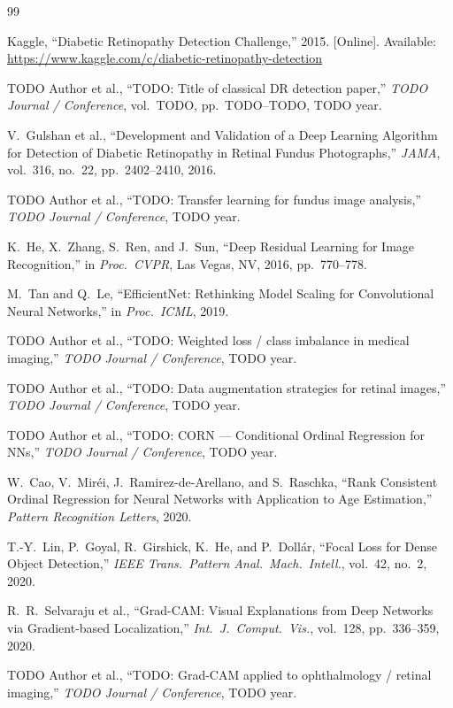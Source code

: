 \documentclass[12pt, a4paper]{article}
\begin{document}
\begin{thebibliography}{99}

Kaggle, ``Diabetic Retinopathy Detection Challenge,'' 2015.
[Online]. Available: \url{https://www.kaggle.com/c/diabetic-retinopathy-detection}

TODO Author et al., ``TODO: Title of classical DR detection paper,''
\textit{TODO Journal / Conference}, vol.~TODO, pp.~TODO--TODO, TODO year.

V.~Gulshan et al., ``Development and Validation of a Deep Learning Algorithm
for Detection of Diabetic Retinopathy in Retinal Fundus Photographs,''
\textit{JAMA}, vol.~316, no.~22, pp.~2402--2410, 2016.

TODO Author et al., ``TODO: Transfer learning for fundus image analysis,''
\textit{TODO Journal / Conference}, TODO year.

K.~He, X.~Zhang, S.~Ren, and J.~Sun, ``Deep Residual Learning for Image
Recognition,'' in \textit{Proc.\ CVPR}, Las Vegas, NV, 2016, pp.~770--778.

M.~Tan and Q.~Le, ``EfficientNet: Rethinking Model Scaling for Convolutional
Neural Networks,'' in \textit{Proc.\ ICML}, 2019.

TODO Author et al., ``TODO: Weighted loss / class imbalance in medical imaging,''
\textit{TODO Journal / Conference}, TODO year.

TODO Author et al., ``TODO: Data augmentation strategies for retinal images,''
\textit{TODO Journal / Conference}, TODO year.

TODO Author et al., ``TODO: CORN --- Conditional Ordinal Regression for NNs,''
\textit{TODO Journal / Conference}, TODO year.

W.~Cao, V.~Mir\'{e}i, J.~Ramirez-de-Arellano, and S.~Raschka,
``Rank Consistent Ordinal Regression for Neural Networks with Application to
Age Estimation,'' \textit{Pattern Recognition Letters}, 2020.

T.-Y.~Lin, P.~Goyal, R.~Girshick, K.~He, and P.~Doll\'{a}r,
``Focal Loss for Dense Object Detection,''
\textit{IEEE Trans.\ Pattern Anal.\ Mach.\ Intell.}, vol.~42, no.~2, 2020.

R.~R.~Selvaraju et al., ``Grad-CAM: Visual Explanations from Deep Networks
via Gradient-based Localization,'' \textit{Int.\ J.\ Comput.\ Vis.}, vol.~128,
pp.~336--359, 2020.

TODO Author et al., ``TODO: Grad-CAM applied to ophthalmology / retinal imaging,''
\textit{TODO Journal / Conference}, TODO year.

\end{thebibliography}
\end{document}
